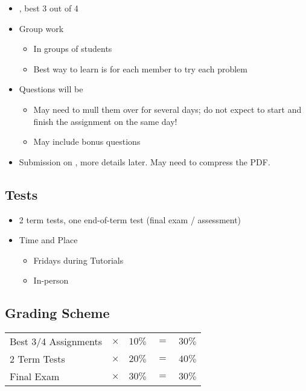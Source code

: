 \begin{itemize}
    \item {}, best 3 out of 4
    \item Group work
    \begin{itemize}
        \item In groups of  students
        \item Best way to learn is for each member to try each problem
    \end{itemize}
    \item Questions will be 
    \begin{itemize}
        \item May need to mull them over for several days; do not expect to start and finish the assignment on the same day!
        \item May include bonus questions
    \end{itemize}
    \item Submission on , more details later. May need to compress the PDF. 
\end{itemize}

\subsection{Tests}

\begin{itemize}
    \item 2 term tests, one end-of-term test (final exam / assessment)
    \item Time and Place
    \begin{itemize}
        \item Fridays during Tutorials
        \item In-person 
    \end{itemize}
\end{itemize}

\subsection{Grading Scheme}

\begin{center}
    \begin{tabular}{l c c c c}
        Best 3/4 Assignments & $\times$ & $10\%$ & $=$ & $30\%$ \\
        2 Term Tests         & $\times$ & $20\%$ & $=$ & $40\%$ \\
        Final Exam           & $\times$ & $30\%$ & $=$ & $30\%$ \\
    \end{tabular}
\end{center}

